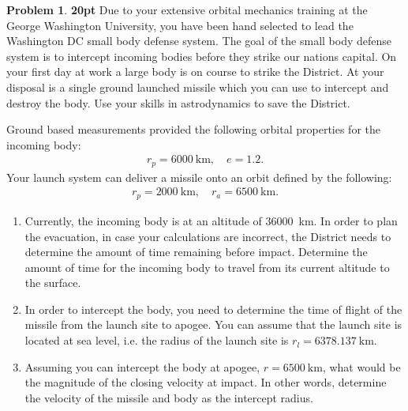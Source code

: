 \documentclass[10pt]{article}
\theoremstyle{definition}
\newtheorem{prob}{Problem}[section]
\newenvironment{subprob}%
{\renewcommand{\theenumi}{\alph{enumi}}\renewcommand{\labelenumi}{(\theenumi)}\begin{enumerate}}%
{\end{enumerate}}%
\begin{document}
\begin{prob}
    \textbf{20pt}
    Due to your extensive orbital mechanics training at the George Washington University, you have been hand selected to lead the Washington DC small body defense system. 
    The goal of the small body defense system is to intercept incoming bodies before they strike our nations capital. 
    On your first day at work a large body is on course to strike the District. 
    At your disposal is a single ground launched missile which you can use to intercept and destroy the body. 
    Use your skills in astrodynamics to save the District. 

    Ground based measurements provided the following orbital properties for the incoming body:
    \begin{align}
        r_p = \SI{6000}{\kilo\meter}, \quad e = 1.2.
    \end{align}
    Your launch system can deliver a missile onto an orbit defined by the following:
    \begin{align}
        r_p = \SI{2000}{\kilo\meter}, \quad r_a = \SI{6500}{\kilo\meter} .
    \end{align}

\begin{subprob}
    \item Currently, the incoming body is at an altitude of \SI{36000}{\kilo\meter}.
        In order to plan the evacuation, in case your calculations are incorrect, the District needs to determine the amount of time remaining before impact.
        Determine the amount of time for the incoming body to travel from its current altitude to the surface.
    \item In order to intercept the body, you need to determine the time of flight of the missile from the launch site to apogee. 
        You can assume that the launch site is located at sea level, i.e. the radius of the launch site is \( r_l = \SI{6378.137}{\kilo\meter}\).
    \item Assuming you can intercept the body at apogee, \( r = \SI{6500}{\kilo\meter} \), what would be the magnitude of the closing velocity at impact.
        In other words, determine the velocity of the missile and body as the intercept radius.
\end{subprob}
\end{prob}
\end{document}
